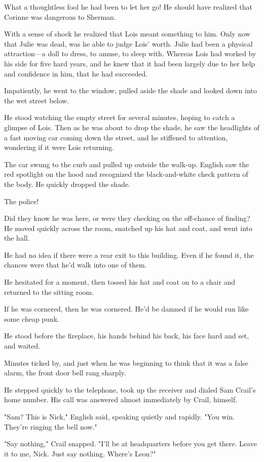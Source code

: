 \documentclass{novel}
\begin{document}
What a thoughtless fool he had been to let her go! He should have realized that Corinne was dangerous to Sherman.

With a sense of shock he realized that Lois meant something to him. Only now that Julie was dead, was he able to judge Lois' worth. Julie had been a physical attraction—a doll to dress, to amuse, to sleep with. Whereas Lois had worked by his side for five hard years, and he knew that it had been largely due to her help and confidence in him, that he had succeeded.

Impatiently, he went to the window, pulled aside the shade and looked down into the wet street below.

He stood watching the empty street for several minutes, hoping to catch a glimpse of Lois. Then as he was about to drop the shade, he saw the headlights of a fast moving car coming down the street, and he stiffened to attention, wondering if it were Lois returning.

The car swung to the curb and pulled up outside the walk-up. English saw the red spotlight on the hood and recognized the black-and-white check pattern of the body. He quickly dropped the shade.

The police!

Did they know he was here, or were they checking on the off-chance of finding? He moved quickly across the room, snatched up his hat and coat, and went into the hall.

He had no idea if there were a rear exit to this building. Even if he found it, the chances were that he'd walk into one of them.

He hesitated for a moment, then tossed his hat and coat on to a chair and returned to the sitting room.

If he was cornered, then he was cornered. He'd be damned if he would run like some cheap punk.

He stood before the fireplace, his hands behind his back, his face hard and set, and waited.

Minutes ticked by, and just when he was beginning to think that it was a false alarm, the front door bell rang sharply.

He stepped quickly to the telephone, took up the receiver and dialed Sam Crail's home number. His call was answered almost immediately by Crail, himself.

"Sam? This is Nick," English said, speaking quietly and rapidly. "You win. They're ringing the bell now."

"Say nothing," Crail snapped. "I'll be at headquarters before you get there. Leave it to me, Nick. Just say nothing. Where's Leon?"
\end{document}
